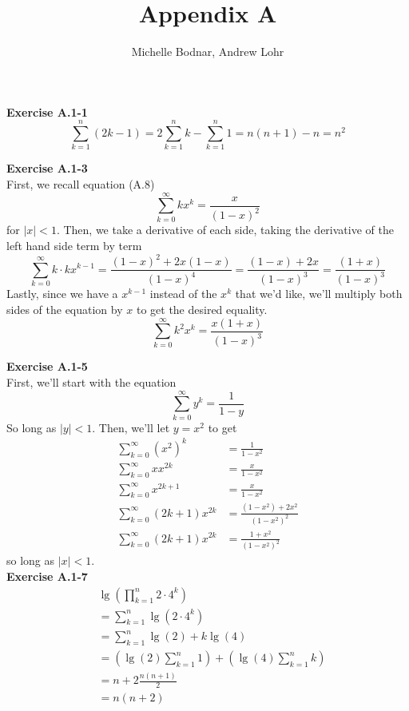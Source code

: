 \documentclass{article}
\title{Appendix A}
\author{Michelle Bodnar, Andrew Lohr}
\begin{document}
\maketitle
\noindent\textbf{Exercise A.1-1}\\

\[
\sum_{k=1}^{n} (2k -1) = 2\sum_{k=1}^{n} k - \sum_{k=1}^n 1 = n(n+1) - n = n^2
\]

\noindent\textbf{Exercise A.1-3}\\
First, we recall equation (A.8)
\[
\sum_{k=0}^\infty k x^k = \frac{x}{(1-x)^2}
\]
for $|x|<1$. Then, we take a derivative of each side, taking the derivative of the left hand side term by term
\[
\sum_{k=0}^\infty k\cdot kx^{k-1} = \frac{(1-x)^2 + 2x (1-x)}{(1-x)^4} = \frac{(1-x) + 2x}{(1-x)^3} = \frac{(1+x)}{(1-x)^3}
\]
Lastly, since we have a $x^{k-1}$ instead of the $x^k$ that we'd like, we'll multiply both sides of the equation by $x$ to get the desired equality.
\[
\sum_{k=0}^\infty k^2 x^k = \frac{x(1+x)}{(1-x)^3}
\]

\noindent\textbf{Exercise A.1-5}\\

First, we'll start with the equation 
\[
\sum_{k=0}^\infty y^k = \frac{1}{1-y}
\]
So long as $|y|<1$. Then, we'll let $y = x^2$ to get 
\begin{align*}
\sum_{k=0}^\infty (x^2)^k &= \frac{1}{1-x^2}\\
\sum_{k=0}^\infty xx^{2k} &= \frac{x}{1-x^2}\\
\sum_{k=0}^\infty x^{2k+1} &= \frac{x}{1-x^2}\\
\sum_{k=0}^\infty (2k+1) x^{2k} &= \frac{(1-x^2) +2 x^2 }{(1-x^2)^2}\\
\sum_{k=0}^\infty (2k+1) x^{2k} &= \frac{1 +x^2 }{(1-x^2)^2}
\end{align*}
so long as $|x|<1$.\\

\noindent\textbf{Exercise A.1-7}\\

\begin{align*}
&\lg\left(\prod_{k=1}^n 2\cdot 4^k\right)\\
&=\sum_{k=1}^n \lg(2 \cdot 4^k) \\
&=\sum_{k=1}^n \lg(2) + k \lg(4) \\
&=\left(\lg(2) \sum_{k=1}^n 1\right) + \left(\lg(4) \sum_{k=1}^n k\right) \\
&=n + 2 \frac{n(n+1)}{2}\\
&= n(n+2)
\end{align*}
\end{document}
